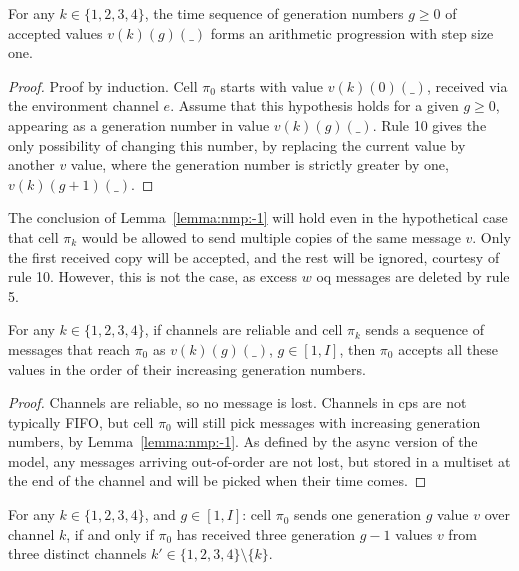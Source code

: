 \begin{lemma}\label{lemma:nmp:-1}
    For any $k \in \{ 1, 2, 3, 4 \}$, the time sequence of generation numbers $g \geq 0$ of accepted values $v(k)(g)(\_)$ forms an arithmetic progression with step size one.
\end{lemma}

\begin{proof}
    Proof by induction. Cell $\pi_0$ starts with value $v(k)(0)(\_)$, received via the environment channel $e$.
    Assume that this hypothesis holds for a given $g \geq 0$, appearing as a generation number in value $v(k)(g)(\_)$. Rule 10 gives the only possibility of changing this number, by replacing the current value by another $v$ value, where the generation number is strictly greater by one, 
    $v(k)(g+1)(\_)$. %
\end{proof}

\begin{remark}\label{remark:nmp:-1}
The conclusion of Lemma~\ref{lemma:nmp:-1} will hold even in the hypothetical case that cell $\pi_k$ would be allowed to send multiple copies of the same message $v$. 
Only the first received copy will be accepted, and the rest will be ignored,
courtesy of rule 10. However, this is not the case, as excess \(w\) \gls{oq} messages are deleted by rule 5. 
\end{remark}

\begin{lemma}\label{lemma:nmp:-2}
    For any $k \in \{ 1, 2, 3, 4 \}$, if channels are reliable and cell $\pi_k$ sends a sequence of messages that reach $\pi_0$ as $v(k)(g)(\_)$, $g \in [1,I]$, 
    then $\pi_0$ accepts all these values in the order of their increasing generation numbers.
\end{lemma}

\begin{proof}
    Channels are reliable, so no message is lost. Channels in \gls{cps} are not typically FIFO, but cell $\pi_0$ will still pick messages with increasing generation numbers, by Lemma~\ref{lemma:nmp:-1}.
    As defined by the async version of the model, any messages arriving out-of-order are not lost, but stored in a multiset at the end of the channel
    and will be picked when their time comes. %
\end{proof}

\begin{lemma}\label{lemma:nmp:-3}
    For any $k \in \{ 1, 2, 3, 4 \}$, and $g \in [1, I]$: cell $\pi_0$ sends one generation $g$ value $v$ over channel $k$, if and only if $\pi_0$ has received three generation $g-1$ values $v$ from three distinct channels $k' \in 
    \{ 1, 2, 3, 4 \} \setminus \{ k \}$.
\end{lemma}

